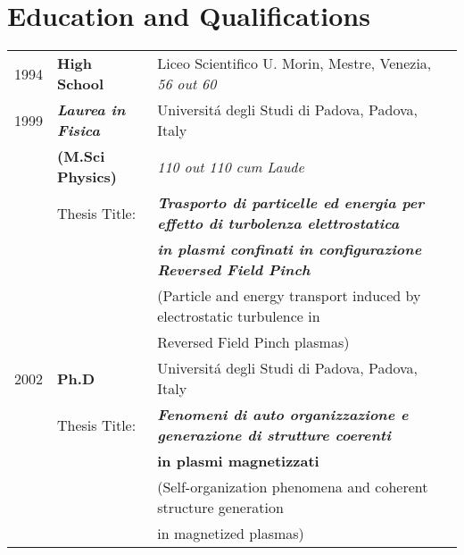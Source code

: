 \section{Education and Qualifications}
\begin{tabular}{lll}
1994 & \textbf{ High School} & Liceo Scientifico U. Morin, Mestre, Venezia,
\textit{56 out 60}\\
1999 & \textbf{\textit{Laurea in Fisica} } &
Universit\'a degli Studi di Padova, Padova, Italy \\
 & \textbf{(M.Sci Physics)} & \textit{110 out 110 cum Laude} \\
 &Thesis Title:  & \textbf{\emph{Trasporto di particelle ed energia per effetto
 di turbolenza elettrostatica}} \\
& & \textbf{\emph{in plasmi confinati in configurazione
 Reversed Field Pinch}} \\ 
& & (Particle and energy transport induced by
electrostatic turbulence in \\
& &  Reversed Field Pinch  plasmas) \\ 
2002 & \textbf{Ph.D} & Universit\'a degli Studi di Padova, Padova,
Italy \\
& Thesis Title: & \textbf{\emph{Fenomeni di auto organizzazione e
    generazione di strutture coerenti}} \\
& & \textbf{in plasmi magnetizzati} \\
& & (Self-organization phenomena and coherent structure generation \\
& & in magnetized plasmas)
\end{tabular}
